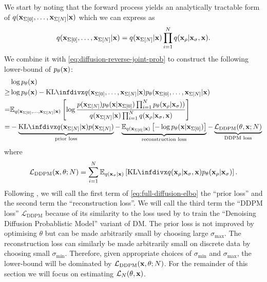 We start by noting that the forward process yields an analytically tractable form of $q({\mathbf{x}}_{\Sigma[0]},\ldots,{\mathbf{x}}_{\Sigma[N]}|{\mathbf{x}})$ which we can express as
\begin{equation}
    q({\mathbf{x}}_{\Sigma[0]},\ldots,{\mathbf{x}}_{\Sigma[N]}|{\mathbf{x}}) = q({\mathbf{x}}_{\Sigma[N]}|{\mathbf{x}}) \prod_{i=1}^N q({\mathbf{x}}_{\rho} | {\mathbf{x}}_{\sigma}, {\mathbf{x}}).
\end{equation}We combine it with \cref{eq:diffusion-reverse-joint-prob} to construct the following lower-bound of $p_\theta({\mathbf{x}})$:
\begin{align}
    &\log p_\theta(\rvx) \\
    \geq &\log p_\theta(\rvx) - \kl{q(\rvx_{\Sigma[0]},\ldots,\rvx_{\Sigma[N]}|\rvx)}{p_\theta(\rvx_{\Sigma[0]},\ldots,\rvx_{\Sigma[N]}|\rvx)} \\
    = &\EX_{q(\rvx_{\Sigma[0]},\ldots,\rvx_{\Sigma[N]}|\rvx)} \left[ \log \frac{p(\rvx_{\Sigma[N]}) p_\theta(\rvx|\rvx_{\Sigma[0]}) \prod_{i=1}^N p_\theta(\rvx_{\rho} | \rvx_{\sigma}) ) }{q(\rvx_{\Sigma[N]}|\rvx) \prod_{i=1}^N q(\rvx_{\rho} | \rvx_{\sigma}, \rvx)} \right] \\
    = & -\underbrace{\kl{q(\rvx_{\Sigma[N]}|\rvx)}{p(\rvx_{\Sigma[N]})}}_\text{prior loss} - \underbrace{\EX_{q(\rvx_{\Sigma[0]}|\rvx)} \left[ - \log p_\theta(\rvx|\rvx_{\Sigma[0]}) \right]}_\text{reconstruction loss} - \underbrace{\mathcal{L}_\text{DDPM}(\theta, \rvx; N)}_\text{DDPM loss} \label{eq:full-diffusion-elbo}
\end{align}
where
\begin{align}
    \mathcal{L}_\text{DDPM}(\rvx, \theta; N) = \sum_{i=1}^N \EX_{q(\rvx_{\sigma}|\rvx)} \left[ \kl{q(\rvx_{\rho} | \rvx_{\sigma}, \rvx)}{p_\theta(\rvx_{\rho} | \rvx_{\sigma})} \right].
\end{align}
Following \citet{kingma2021variational}, we will call the first term of \cref{eq:full-diffusion-elbo} the ``prior loss'' and the second term the ``reconstruction loss''. We will call the third term the ``DDPM loss'' $\mathcal{L}_\text{DDPM}$ because of its similarity to the loss used by \citet{ho2020denoising} to train the ``Denoising Diffusion Probablistic Model'' variant of DM. The prior loss is not improved by optimising $\theta$ but can be made arbitrarily small by choosing large $\sigma_\text{max}$. The reconstruction loss can similarly be made arbitrarily small on discrete data by choosing small $\sigma_\text{min}$. Therefore, given appropriate choices of $\sigma_\text{min}$ and $\sigma_\text{max}$, the lower-bound will be dominated by $\mathcal{L}_\text{DDPM}({\mathbf{x}}, \theta; N)$. For the remainder of this section we will focus on estimating $\mathcal{L}_N(\theta, {\mathbf{x}})$.

